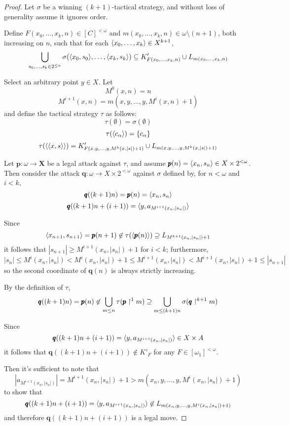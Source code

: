\begin{proof}
  Let $\sigma$ be a winning $(k+1)$-tactical strategy, and without loss of
  generality assume it ignores order.

  Define $F(x_0,\dots,x_{k},n)\in [C]^{<\omega}$ and
  $m(x_0,\dots,x_{k},n)\in\omega\setminus(n+1)$, both increasing on $n$,
  such that for each $\langle x_0,\dots,x_{k}\rangle\in X^{k+1}$,
  \[
    \bigcup_{s_0,\dots,s_k \in 2^{\leq n}}
    \sigma(\langle x_0,s_0\rangle,\dots,\langle x_{k},s_{k}\rangle)
      \subseteq
    K'_{F(x_0,\dots,x_{k},n)} \cup L_{m(x_0,\dots,x_{k},n)}
  \]

  Select an arbitrary point $y \in X$.
  Let
    \[
      M^0(x,n)=n
    \]
    \[
      M^{i+1}(x,n)=m(x,y,\dots,y,M^i(x,n)+1)
    \]
  and define the tactical strategy $\tau$ as follows:
  \[
    \tau(\emptyset)
      =
    \sigma(\emptyset)
  \]
  \[
    \tau(\langle c_\alpha\rangle)
      =
    \{c_\alpha\}
  \]
  \[
    \tau(\langle\langle x,s\rangle\rangle)
      =
    K'_{F(x,y,\dots,y,M^k(x,|s|)+1)}
      \cup
    L_{m(x,y,\dots,y,M^k(x,|s|)+1)}
  \]

  Let $\pmb p:\omega\to \pmb X$ be a legal attack against
  $\tau$, and assume $\pmb p(n)=\langle x_n,s_n\rangle\in X\times 2^{<\omega}$.
  Then consider the attack $\pmb q:\omega\to X\times 2^{<\omega}$ against
  $\sigma$ defined by, for $n<\omega$ and $i<k$,
    \[
      \pmb q((k+1)n)=\pmb p(n)=\langle x_n,s_n\rangle
    \]
    \[
      \pmb q((k+1)n+(i+1))=\langle y, a_{M^{i+1}(x_n,|s_n|)}\rangle
    \]

  Since
    \[
      \langle x_{n+1},s_{n+1}\rangle
        =
      \pmb p(n+1)
        \not\in
      \tau(\langle\pmb p(n)\rangle)
        \supseteq
      L_{M^{k+1}(x_n,|s_n|)+1}
    \]
  it follows that
  $|s_{n+1}|\geq M^{i+1}(x_n,|s_n|)+1$ for $i<k$; furthermore,
    \[
      |s_n|
        \leq
      M^i(x_n,|s_n|)
        <
      M^i(x_n,|s_n|)+1
        \leq
      M^{i+1}(x_n,|s_n|)
        <
      M^{i+1}(x_n,|s_n|)+1
        \leq
      |s_{n+1}|
    \]
  so the second coordinate of $\pmb q(n)$ is always strictly increasing.

  By the definition of $\tau$,
    \[
      \pmb q((k+1)n)
        =
      \pmb p(n)
        \not\in
      \bigcup_{m\leq n}
      \tau(\pmb p\restriction^1 m)
        \supseteq
      \bigcup_{m\leq (k+1)n}
      \sigma(\pmb q\restriction^{k+1} m)
    \]

  Since
    \[
      \pmb q((k+1)n+(i+1))
        =
      \langle y, a_{M^{i+1}(x_n,|s_n|)}\rangle
        \in
      X\times A
    \]
  it follows that $\pmb q((k+1)n+(i+1))\not\in K'_F$ for any
  $F\in[\omega_1]^{<\omega}$.

  Then it's sufficient to note that
    \[
      |a_{M^{i+1}(x_n,|s_n|)}|
        =
      M^{i+1}(x_n,|s_n|) + 1
        >
      m(x_n,y,\dots,y,M^i(x_n,|s_n|)+1)
    \]
  to show that
    \[
      \pmb q((k+1)n+(i+1))
        =
      \langle y, a_{M^{i+1}(x_n,|s_n|)}\rangle
        \not\in
      L_{m(x_n,y,\dots,y,M^i(x_n,|s_n|)+1)}
    \]
  and therefore $\pmb q((k+1)n+(i+1))$ is a legal move.


\end{proof}
